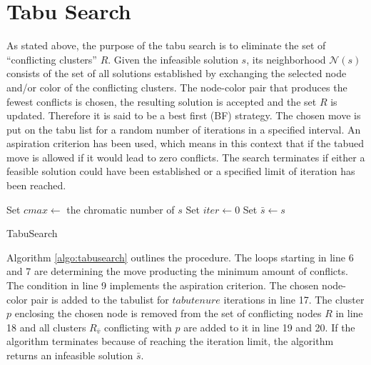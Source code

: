 \section{Tabu Search}
\label{sec:tabu}
As stated above, the purpose of the tabu search is to eliminate the set of ``conflicting clusters'' $R$. Given the infeasible solution $s$, its neighborhood $\mathcal{N}(s)$ consists of the set of all solutions established by exchanging the selected node and/or color of the conflicting clusters. The node-color pair that produces the fewest conflicts is chosen, the resulting solution is accepted and the set $R$ is updated. Therefore it is said to be a best first (BF) strategy. The chosen move is put on the tabu list for a random number of iterations in a specified interval. An aspiration criterion has been used, which means in this context that if the tabued move is allowed if it would lead to zero conflicts. The search terminates if either a feasible solution could have been established or a specified limit of iteration has been reached.

\begin{algorithm}[h]
Set $cmax \gets$ the chromatic number of $s$\;
Set $iter \gets 0$\;
Set $\bar{s} \gets s$\;
\;
\caption{TabuSearch}
\label{algo:tabusearch}
\end{algorithm}

Algorithm \ref{algo:tabusearch} outlines the procedure. The loops starting in line 6 and 7 are determining the move producting the minimum amount of conflicts. The condition in line 9 implements the aspiration criterion. The chosen node-color pair is added to the tabulist for $\mathit{tabutenure}$ iterations in line 17. The cluster $p$ enclosing the chosen node is removed from the set of conflicting nodes $R$ in line 18 and all clusters $R_{\bar{v}}$ conflicting with $p$ are added to it in line 19 and 20. If the algorithm terminates because of reaching the iteration limit, the algorithm returns an infeasible solution $\bar{s}$.


